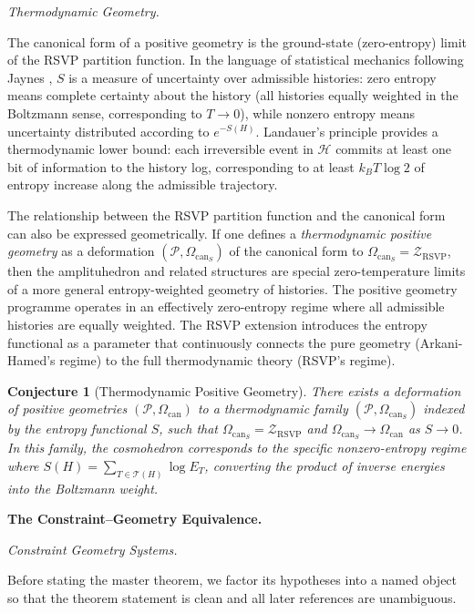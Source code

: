 \documentclass[11pt]{article}
\theoremstyle{plain}
\newtheorem{conjecture}[theorem]{Conjecture}
\theoremstyle{definition}
\theoremstyle{remark}
\newcommand{\Sf}{S}
\newcommand{\HKS}{\mathcal{H}}
\newcommand{\CF}{\Omega_{\mathrm{can}}}
\newcommand{\ZRSVP}{\mathcal{Z}_{\mathrm{RSVP}}}
\begin{document}
\medskip\noindent\textit{Thermodynamic Geometry.}

The canonical form of a positive geometry is the ground-state (zero-entropy) limit of the RSVP partition function. In the language of statistical mechanics following Jaynes \cite{Jaynes1957}, $\Sf$ is a measure of uncertainty over admissible histories: zero entropy means complete certainty about the history (all histories equally weighted in the Boltzmann sense, corresponding to $T \to 0$), while nonzero entropy means uncertainty distributed according to $e^{-\Sf(H)}$. Landauer's principle \cite{Landauer1961} provides a thermodynamic lower bound: each irreversible event in $\HKS$ commits at least one bit of information to the history log, corresponding to at least $k_B T \log 2$ of entropy increase along the admissible trajectory.

The relationship between the RSVP partition function and the canonical form can also be expressed geometrically. If one defines a \emph{thermodynamic positive geometry} as a deformation $(\mathcal{P}, \CF_{\Sf})$ of the canonical form to $\CF_{\Sf} = \ZRSVP$, then the amplituhedron and related structures are special zero-temperature limits of a more general entropy-weighted geometry of histories. The positive geometry programme operates in an effectively zero-entropy regime where all admissible histories are equally weighted. The RSVP extension introduces the entropy functional as a parameter that continuously connects the pure geometry (Arkani-Hamed's regime) to the full thermodynamic theory (RSVP's regime).

\begin{conjecture}[Thermodynamic Positive Geometry]
There exists a deformation of positive geometries $(\mathcal{P}, \CF)$ to a thermodynamic family $(\mathcal{P}, \CF_{\Sf})$ indexed by the entropy functional $\Sf$, such that $\CF_{\Sf} = \ZRSVP$ and $\CF_{\Sf} \to \CF$ as $\Sf \to 0$. In this family, the cosmohedron corresponds to the specific nonzero-entropy regime where $\Sf(H) = \sum_{T \in \mathcal{T}(H)} \log E_T$, converting the product of inverse energies into the Boltzmann weight.
\end{conjecture}

\bigskip\noindent\textbf{The Constraint--Geometry Equivalence.}
\label{sec:master}

\medskip\noindent\textit{Constraint Geometry Systems.}

Before stating the master theorem, we factor its hypotheses into a named object so that the theorem statement is clean and all later references are unambiguous.
\end{document}
